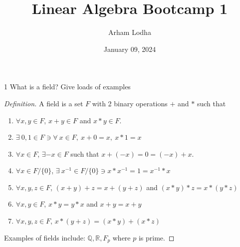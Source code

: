 \documentclass{article}
\newcommand{\R}{\mathbb{R}}
\newcommand{\Q}{\mathbb{Q}}
\newenvironment{definition}
{\renewcommand\qedsymbol{$\blacksquare$}\begin{proof}[Definition]}
{\end{proof}}
\begin{document}
\title{Linear Algebra Bootcamp 1}
\author{Arham Lodha}%
\date{January 09, 2024}%
\maketitle

\begin{PROB}{1}\label{Problem 1.}
    What is a field? Give loads of examples
\end{PROB}
\begin{definition}
    A field is a set $F$ with 2 binary operations $+$ and $*$ such that 
    \begin{enumerate}
        \item $\forall x, y \in F$, $x + y \in F$ and $x * y \in F$.
        \item $\exists ~ 0, 1 \in F \ni \forall ~ x \in F, ~ x + 0 = x, ~ x * 1 = x$
        \item $\forall x \in F$, $\exists -x \in F$ such that $x + (-x) = 0 = (-x) + x$.
        \item $\forall x \in F/\{0\}$, $\exists ~ x^{-1} \in F/\{0\} \ni x * x^{-1} = 1 = x^{-1} * x$
        \item $\forall x, y, z \in F$, $(x + y) + z = x + (y + z)$ and $(x * y) * z = x * (y * z)$
        \item $\forall x, y \in F$, $x * y = y * x$ and $x + y = x + y$
        \item $\forall x, y, z \in F$, $x * (y + z) = (x * y) + (x * z)$
    \end{enumerate}

    Examples of fields include: $\Q, \R, F_p$ where $p$ is prime.
\end{definition}

\bigskip
\end{document}
